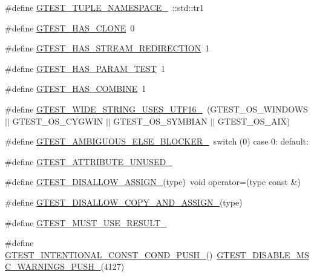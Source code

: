 \begin{DoxyCompactItemize}
\#define \mbox{\hyperlink{gtest-port_8h_a2023f59bfbd8fb7148262a63bdbf0b01}{G\+T\+E\+S\+T\+\_\+\+T\+U\+P\+L\+E\+\_\+\+N\+A\+M\+E\+S\+P\+A\+C\+E\+\_\+}}~\+::std\+::tr1
\item 
\#define \mbox{\hyperlink{gtest-port_8h_a40c075a7f969a694e59532356be59fd5}{G\+T\+E\+S\+T\+\_\+\+H\+A\+S\+\_\+\+C\+L\+O\+NE}}~0
\item 
\#define \mbox{\hyperlink{gtest-port_8h_add695166eb7b691f93777525d5881062}{G\+T\+E\+S\+T\+\_\+\+H\+A\+S\+\_\+\+S\+T\+R\+E\+A\+M\+\_\+\+R\+E\+D\+I\+R\+E\+C\+T\+I\+ON}}~1
\item 
\#define \mbox{\hyperlink{gtest-port_8h_a743ee591e0b9a044e3d7513ad5ab5ef9}{G\+T\+E\+S\+T\+\_\+\+H\+A\+S\+\_\+\+P\+A\+R\+A\+M\+\_\+\+T\+E\+ST}}~1
\item 
\#define \mbox{\hyperlink{gtest-port_8h_a91a068d3bf6855b6f399f01836ae1482}{G\+T\+E\+S\+T\+\_\+\+H\+A\+S\+\_\+\+C\+O\+M\+B\+I\+NE}}~1
\item 
\#define \mbox{\hyperlink{gtest-port_8h_a0e3904ca8d62334ab5f29c057dceb6a1}{G\+T\+E\+S\+T\+\_\+\+W\+I\+D\+E\+\_\+\+S\+T\+R\+I\+N\+G\+\_\+\+U\+S\+E\+S\+\_\+\+U\+T\+F16\+\_\+}}~(G\+T\+E\+S\+T\+\_\+\+O\+S\+\_\+\+W\+I\+N\+D\+O\+WS $\vert$$\vert$ G\+T\+E\+S\+T\+\_\+\+O\+S\+\_\+\+C\+Y\+G\+W\+IN $\vert$$\vert$ G\+T\+E\+S\+T\+\_\+\+O\+S\+\_\+\+S\+Y\+M\+B\+I\+AN $\vert$$\vert$ G\+T\+E\+S\+T\+\_\+\+O\+S\+\_\+\+A\+IX)
\item 
\#define \mbox{\hyperlink{gtest-port_8h_a00b3684a621ce1422b55a0e7e8a6aecb}{G\+T\+E\+S\+T\+\_\+\+A\+M\+B\+I\+G\+U\+O\+U\+S\+\_\+\+E\+L\+S\+E\+\_\+\+B\+L\+O\+C\+K\+E\+R\+\_\+}}~switch (0) case 0\+: default\+:
\item 
\#define \mbox{\hyperlink{gtest-port_8h_acdd47601a9376161c349a5881ccc6918}{G\+T\+E\+S\+T\+\_\+\+A\+T\+T\+R\+I\+B\+U\+T\+E\+\_\+\+U\+N\+U\+S\+E\+D\+\_\+}}
\item 
\#define \mbox{\hyperlink{gtest-port_8h_ac593b50ce24257d5b6aa84845c344c9e}{G\+T\+E\+S\+T\+\_\+\+D\+I\+S\+A\+L\+L\+O\+W\+\_\+\+A\+S\+S\+I\+G\+N\+\_\+}}(type)~void operator=(type const \&)
\item 
\#define \mbox{\hyperlink{gtest-port_8h_aed8c1888c32b588b0681e88b95031e29}{G\+T\+E\+S\+T\+\_\+\+D\+I\+S\+A\+L\+L\+O\+W\+\_\+\+C\+O\+P\+Y\+\_\+\+A\+N\+D\+\_\+\+A\+S\+S\+I\+G\+N\+\_\+}}(type)
\item 
\#define \mbox{\hyperlink{gtest-port_8h_a8e5aab8276b2645f64f41c9e3021b935}{G\+T\+E\+S\+T\+\_\+\+M\+U\+S\+T\+\_\+\+U\+S\+E\+\_\+\+R\+E\+S\+U\+L\+T\+\_\+}}
\item 
\#define \mbox{\hyperlink{gtest-port_8h_a69b0cadb05bf2a1ef96151243c6b6241}{G\+T\+E\+S\+T\+\_\+\+I\+N\+T\+E\+N\+T\+I\+O\+N\+A\+L\+\_\+\+C\+O\+N\+S\+T\+\_\+\+C\+O\+N\+D\+\_\+\+P\+U\+S\+H\+\_\+}}()~\mbox{\hyperlink{gtest-port_8h_a86994cc68e844d8b82089c70408dfc61}{G\+T\+E\+S\+T\+\_\+\+D\+I\+S\+A\+B\+L\+E\+\_\+\+M\+S\+C\+\_\+\+W\+A\+R\+N\+I\+N\+G\+S\+\_\+\+P\+U\+S\+H\+\_\+}}(4127)
$$
\end{DoxyCompactItemize}
